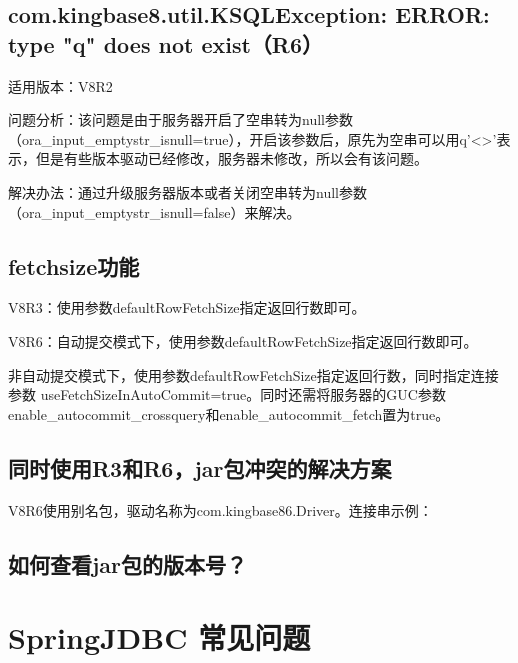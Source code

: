 \documentclass[letterpaper,10pt,english]{sphinxmanual}
\begin{document}
\subsection{com.kingbase8.util.KSQLException: ERROR: type "q" does not exist（R6）}
\label{\detokenize{interface/jdbc:com-kingbase8-util-ksqlexception-error-type-q-does-not-exist-r6}}
适用版本：V8R2

问题分析：该问题是由于服务器开启了空串转为null参数（ora\_input\_emptystr\_isnull=true），开启该参数后，原先为空串可以用q'<>'表示，但是有些版本驱动已经修改，服务器未修改，所以会有该问题。

解决办法：通过升级服务器版本或者关闭空串转为null参数（ora\_input\_emptystr\_isnull=false）来解决。


\subsection{fetchsize功能}
\label{\detokenize{interface/jdbc:fetchsize}}
V8R3：使用参数defaultRowFetchSize指定返回行数即可。

V8R6：自动提交模式下，使用参数defaultRowFetchSize指定返回行数即可。

非自动提交模式下，使用参数defaultRowFetchSize指定返回行数，同时指定连接参数     useFetchSizeInAutoCommit=true。同时还需将服务器的GUC参数enable\_autocommit\_crossquery和enable\_autocommit\_fetch置为true。


\subsection{同时使用R3和R6，jar包冲突的解决方案}
\label{\detokenize{interface/jdbc:r3r6-jar}}
V8R6使用别名包，驱动名称为com.kingbase86.Driver。连接串示例：


\subsection{如何查看jar包的版本号？}
\label{\detokenize{interface/jdbc:jar}}
\begin{sphinxVerbatim}[commandchars=\\\{\}]
   
\end{sphinxVerbatim}


\section{Spring\sphinxhyphen{}JDBC 常见问题}
\label{\detokenize{interface/spring-jdbc:spring-jdbc}}\label{\detokenize{interface/spring-jdbc::doc}}
\end{document}
